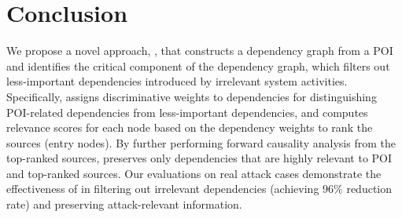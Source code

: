 \section{Conclusion}
We propose a novel approach, \tool, that constructs a dependency graph from a POI and identifies the critical component of the dependency graph, which filters out less-important dependencies introduced by irrelevant system activities.
Specifically, \tool assigns discriminative weights to dependencies for distinguishing POI-related dependencies from less-important dependencies, 
and computes relevance scores for each node based on the dependency weights to rank the sources (\ie entry nodes).
By further performing forward causality analysis from the top-ranked sources, \tool preserves only dependencies that are highly relevant to POI and top-ranked sources.
Our evaluations on real attack cases demonstrate the effectiveness of \tool in filtering out irrelevant dependencies (achieving $96\%$ reduction rate) and preserving attack-relevant information.



